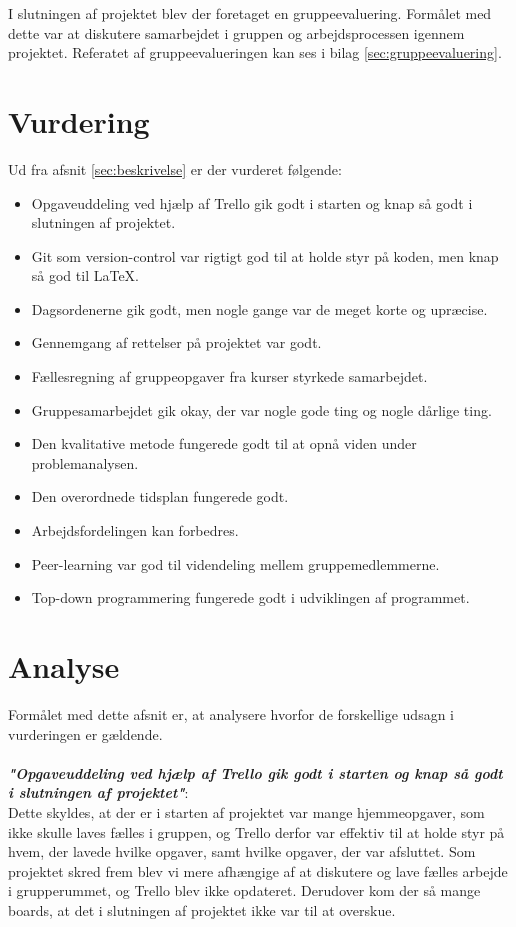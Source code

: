 \documentclass[oneside,a4paper,titlepage]{article}
\begin{document}
I slutningen af projektet blev der foretaget en gruppeevaluering. Formålet med dette var at diskutere samarbejdet i gruppen og arbejdsprocessen igennem projektet. Referatet af gruppeevalueringen kan ses i bilag \ref{sec:gruppeevaluering}.

\section{Vurdering}
Ud fra afsnit \ref{sec:beskrivelse} er der vurderet følgende:
\begin{itemize}
  \item Opgaveuddeling ved hjælp af Trello gik godt i starten og knap så godt i slutningen af projektet.
  \item Git som version-control var rigtigt god til at holde styr på koden, men knap så god til LaTeX.
  \item Dagsordenerne gik godt, men nogle gange var de meget korte og upræcise.
  \item Gennemgang af rettelser på projektet var godt.
  \item Fællesregning af gruppeopgaver fra kurser styrkede samarbejdet.
  \item Gruppesamarbejdet gik okay, der var nogle gode ting og nogle dårlige ting. 
  \item Den kvalitative metode fungerede godt til at opnå viden under problemanalysen.
  \item Den overordnede tidsplan fungerede godt.
  \item Arbejdsfordelingen kan forbedres.
  \item Peer-learning var god til videndeling mellem gruppemedlemmerne.
  \item Top-down programmering fungerede godt i udviklingen af programmet.
\end{itemize}
\setlength\parindent{0pt}
\section{Analyse}
Formålet med dette afsnit er, at analysere hvorfor de forskellige udsagn i vurderingen er gældende.
 \\\\
\textbf{\textit{"Opgaveuddeling ved hjælp af Trello gik godt i starten og knap så godt i slutningen af projektet"}}: \\

Dette skyldes, at der er i starten af projektet var mange hjemmeopgaver, som ikke skulle laves fælles i gruppen, og Trello derfor var effektiv til at holde styr på hvem, der lavede hvilke opgaver, samt hvilke opgaver, der var afsluttet. Som projektet skred frem blev vi mere afhængige af at diskutere og lave fælles arbejde i grupperummet, og Trello blev ikke opdateret. Derudover kom der så mange boards, at det i slutningen af projektet ikke var til at overskue. \\
\end{document}
